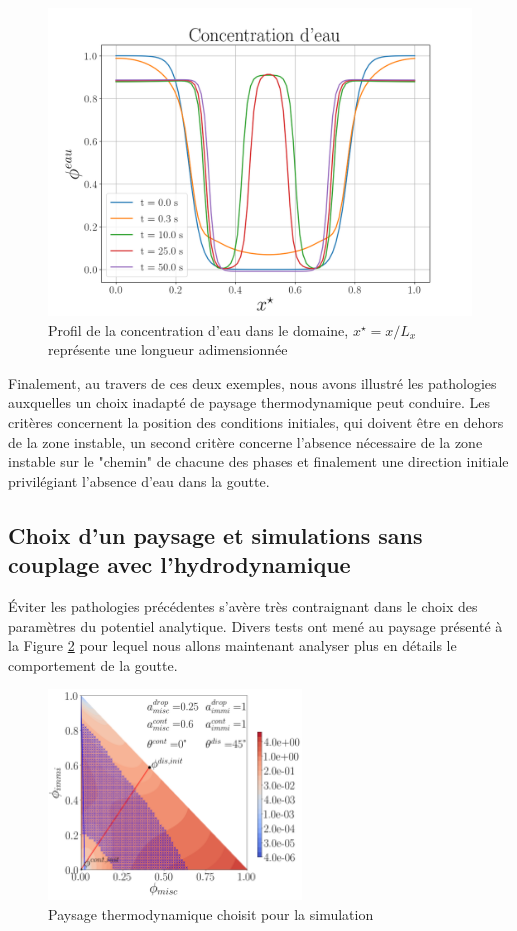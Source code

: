  \begin{figure}[H]
 	\centering
 	\includegraphics[width=0.5\linewidth]{figure/eau_ref}
 	\caption[Concentration d'eau dans le domaine]{Profil de la concentration d'eau dans le domaine, $x^{\star} = x / L_x$ représente une longueur adimensionnée}
 	\label{fig:eauref}
 \end{figure}\vspace{-0.7cm}
Finalement, au travers de ces deux exemples, nous avons illustré les pathologies auxquelles un choix inadapté de paysage thermodynamique peut conduire. Les critères concernent la position des conditions initiales, qui doivent être en dehors de la zone instable, un second critère concerne l'absence nécessaire de la zone instable sur le "chemin" de chacune des phases et finalement une direction initiale privilégiant l'absence d'eau dans la goutte.
\subsection{Choix d'un paysage et simulations sans couplage avec l'hydrodynamique}
Éviter les pathologies précédentes s'avère très contraignant dans le choix des paramètres du potentiel analytique. Divers tests ont mené au paysage présenté à la Figure \ref{fig:thechoosenone} pour lequel nous allons maintenant analyser plus en détails le comportement de la goutte.
\begin{figure}[H]
		\centering
		\includegraphics[width=0.6\textwidth]{figure/Paysage_ecriture1.png}
	\caption{Paysage thermodynamique choisit pour la simulation}
	\label{fig:thechoosenone}
\end{figure}

